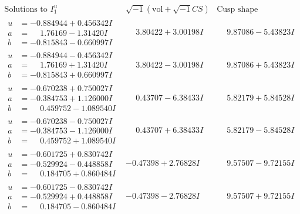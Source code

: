 \documentclass[1p]{elsarticle_modified}
\theoremstyle{definition}
\newcommand{\I}{\sqrt{-1}}
\begin{document}
$$\begin{array}{c|c|c}  
\text{Solutions to }I^u_{1}& \I (\text{vol} + \sqrt{-1}CS) & \text{Cusp shape}\\
 \hline 
\begin{aligned}
u &= -0.884944 + 0.456342 I \\
a &= \phantom{-}1.76169 - 1.31420 I \\
b &= -0.815843 - 0.660997 I\end{aligned}
 & \phantom{-}3.80422 + 3.00198 I & \phantom{-}9.87086 - 5.43823 I \\ \hline\begin{aligned}
u &= -0.884944 - 0.456342 I \\
a &= \phantom{-}1.76169 + 1.31420 I \\
b &= -0.815843 + 0.660997 I\end{aligned}
 & \phantom{-}3.80422 - 3.00198 I & \phantom{-}9.87086 + 5.43823 I \\ \hline\begin{aligned}
u &= -0.670238 + 0.750027 I \\
a &= -0.384753 + 1.126000 I \\
b &= \phantom{-}0.459752 - 1.089540 I\end{aligned}
 & \phantom{-}0.43707 - 6.38433 I & \phantom{-}5.82179 + 5.84528 I \\ \hline\begin{aligned}
u &= -0.670238 - 0.750027 I \\
a &= -0.384753 - 1.126000 I \\
b &= \phantom{-}0.459752 + 1.089540 I\end{aligned}
 & \phantom{-}0.43707 + 6.38433 I & \phantom{-}5.82179 - 5.84528 I \\ \hline\begin{aligned}
u &= -0.601725 + 0.830742 I \\
a &= -0.529924 - 0.448858 I \\
b &= \phantom{-}0.184705 + 0.860484 I\end{aligned}
 & -0.47398 + 2.76828 I & \phantom{-}9.57507 - 9.72155 I \\ \hline\begin{aligned}
u &= -0.601725 - 0.830742 I \\
a &= -0.529924 + 0.448858 I \\
b &= \phantom{-}0.184705 - 0.860484 I\end{aligned}
 & -0.47398 - 2.76828 I & \phantom{-}9.57507 + 9.72155 I \\ \hline\begin{aligned}

\end{aligned}
\end{array}$$
\end{document}
